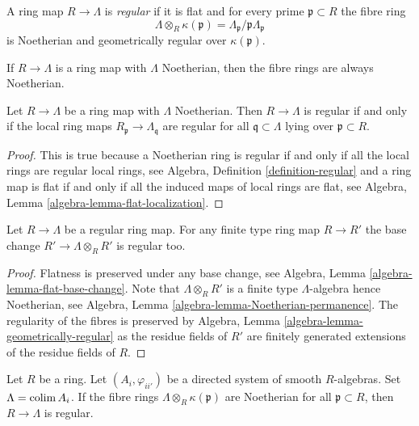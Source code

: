 \begin{definition}
\label{definition-regular}
A ring map $R \to \Lambda$ is {\it regular} if it is flat and
for every prime $\mathfrak p \subset R$ the fibre ring
$$
\Lambda \otimes_R \kappa(\mathfrak p) =
\Lambda_\mathfrak p/\mathfrak p\Lambda_\mathfrak p
$$
is Noetherian and geometrically regular over $\kappa(\mathfrak p)$.
\end{definition}

\noindent
If $R \to \Lambda$ is a ring map with $\Lambda$ Noetherian, then the
fibre rings are always Noetherian.

\begin{lemma}
\label{lemma-regular-local}
Let $R \to \Lambda$ be a ring map with $\Lambda$ Noetherian.
Then $R \to \Lambda$ is regular if and only if the local ring maps
$R_\mathfrak p \to \Lambda_\mathfrak q$ are regular for all
$\mathfrak q \subset \Lambda$ lying over $\mathfrak p \subset R$.
\end{lemma}

\begin{proof}
This is true because a Noetherian ring is regular if and only if
all the local rings are regular local rings, see
Algebra, Definition \ref{definition-regular}
and a ring map is flat if and only if all the induced maps of local
rings are flat, see
Algebra, Lemma \ref{algebra-lemma-flat-localization}.
\end{proof}

\begin{lemma}
\label{lemma-regular-base-change}
Let $R \to \Lambda$ be a regular ring map.
For any finite type ring map $R \to R'$ the base change
$R' \to \Lambda \otimes_R R'$ is regular too.
\end{lemma}

\begin{proof}
Flatness is preserved under any base change, see
Algebra, Lemma \ref{algebra-lemma-flat-base-change}.
Note that $\Lambda \otimes_R R'$ is a finite type
$\Lambda$-algebra hence Noetherian, see
Algebra, Lemma \ref{algebra-lemma-Noetherian-permanence}.
The regularity of the fibres is preserved by
Algebra, Lemma \ref{algebra-lemma-geometrically-regular}
as the residue fields of $R'$ are finitely generated extensions of
the residue fields of $R$.
\end{proof}

\begin{lemma}
\label{lemma-colimit-smooth-regular}
Let $R$ be a ring. Let $(A_i, \varphi_{ii'})$ be a directed system
of smooth $R$-algebras. Set $\Lambda = \mathop{\rm colim}\nolimits A_i$. If the fibre
rings $\Lambda \otimes_R \kappa(\mathfrak p)$ are Noetherian for all
$\mathfrak p \subset R$, then $R \to \Lambda$ is regular.
\end{lemma}

